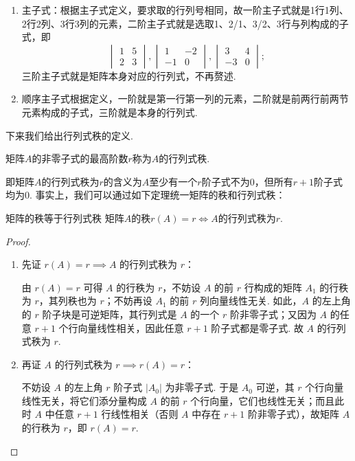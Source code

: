 \begin{solution}
\begin{enumerate}
        \item 主子式：根据主子式定义，要求取的行列号相同，故一阶主子式就是1行1列、2行2列、3行3列的元素，二阶主子式就是选取1、2/1、3/2、3行与列构成的子式，即
              \[\begin{vmatrix}
                      1 & 5 \\ 2 & 3
                  \end{vmatrix},\begin{vmatrix}
                      1 & -2 \\ -1 & 0
                  \end{vmatrix},\begin{vmatrix}
                      3 & 4 \\ -3 & 0
                  \end{vmatrix};\]
              三阶主子式就是矩阵本身对应的行列式，不再赘述.

        \item 顺序主子式根据定义，一阶就是第一行第一列的元素，二阶就是前两行前两节元素构成的子式，三阶就是本身的行列式.
    \end{enumerate}
\end{solution}

下来我们给出行列式秩的定义.

\begin{definition}{}{}
    矩阵$A$的非零子式的最高阶数$r$称为$A$的行列式秩.
\end{definition}

即矩阵$A$的行列式秩为$r$的含义为$A$至少有一个$r$阶子式不为0，但所有$r+1$阶子式均为0. 事实上，我们可以通过如下定理统一矩阵的秩和行列式秩：

\begin{theorem}{}{矩阵的秩等于行列式秩}
    矩阵$A$的秩$r(A)=r \iff A$的行列式秩为$r$.
\end{theorem}

\begin{proof}
    \begin{enumerate}
        \item 先证 $r(A)=r \implies A$ 的行列式秩为 $r$：

            由 $r(A) = r$ 可得 $A$ 的行秩为 $r$，不妨设 $A$ 的前 $r$ 行构成的矩阵 $A_1$ 的行秩为 $r$，其列秩也为 $r$；不妨再设 $A_1$ 的前 $r$ 列向量线性无关. 如此，$A$ 的左上角的 $r$ 阶子块是可逆矩阵，其行列式是 $A$ 的一个 $r$ 阶非零子式；又因为 $A$ 的任意 $r+1$ 个行向量线性相关，因此任意 $r+1$ 阶子式都是零子式. 故 $A$ 的行列式秩为 $r$.

        \item 再证 $A$ 的行列式秩为 $r \implies r(A)=r$：

            不妨设 $A$ 的左上角 $r$ 阶子式 $|A_0|$ 为非零子式. 于是 $A_0$ 可逆，其 $r$ 个行向量线性无关，将它们添分量构成 $A$ 的前 $r$ 个行向量，它们也线性无关；而且此时 $A$ 中任意 $r+1$ 行线性相关（否则 $A$ 中存在 $r+1$ 阶非零子式），故矩阵 $A$ 的行秩为 $r$，即 $r(A)=r$.
    \end{enumerate}
\end{proof}

